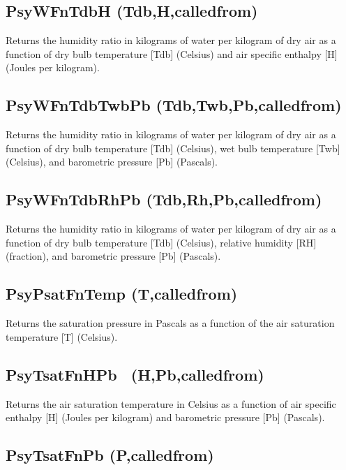 \subsection{PsyWFnTdbH (Tdb,H,calledfrom)}\label{psywfntdbh-tdbhcalledfrom}

Returns the humidity ratio in kilograms of water per kilogram of dry air as a function of dry bulb temperature {[}Tdb{]} (Celsius) and air specific enthalpy {[}H{]} (Joules per kilogram).

\subsection{PsyWFnTdbTwbPb (Tdb,Twb,Pb,calledfrom)}\label{psywfntdbtwbpb-tdbtwbpbcalledfrom}

Returns the humidity ratio in kilograms of water per kilogram of dry air as a function of dry bulb temperature {[}Tdb{]} (Celsius), wet bulb temperature {[}Twb{]} (Celsius), and barometric pressure {[}Pb{]} (Pascals).

\subsection{PsyWFnTdbRhPb (Tdb,Rh,Pb,calledfrom)}\label{psywfntdbrhpb-tdbrhpbcalledfrom}

Returns the humidity ratio in kilograms of water per kilogram of dry air as a function of dry bulb temperature {[}Tdb{]} (Celsius), relative humidity {[}RH{]} (fraction), and barometric pressure {[}Pb{]} (Pascals).

\subsection{PsyPsatFnTemp (T,calledfrom)}\label{psypsatfntemp-tcalledfrom}

Returns the saturation pressure in Pascals as a function of the air saturation temperature {[}T{]} (Celsius).

\subsection{PsyTsatFnHPb~ (H,Pb,calledfrom)}\label{psytsatfnhpb-hpbcalledfrom}

Returns the air saturation temperature in Celsius as a function of air specific enthalpy {[}H{]} (Joules per kilogram) and barometric pressure {[}Pb{]} (Pascals).

\subsection{PsyTsatFnPb (P,calledfrom)}\label{psytsatfnpb-pcalledfrom}

